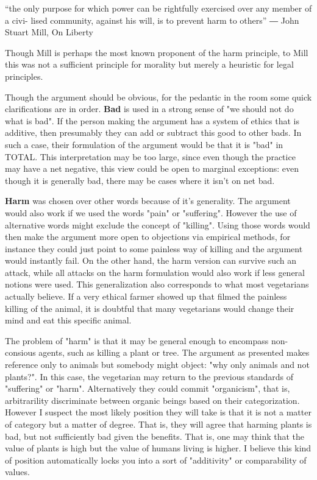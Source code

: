 \documentclass[12pt]{report}
\numberwithin{equation}{section}
\begin{document}
\begin{tcolorbox}[enhanced,%
  colback=green!25!black!10!white,colframe=green!75!black,title=Principle of utility (10cm),
  drop fuzzy shadow,watermark color=white,watermark text=Fit]
“the only purpose for which power can be rightfully exercised over any member of a civi- lised community, against his will, is to prevent harm to others”
― John Stuart Mill, On Liberty
\end{tcolorbox}


Though Mill is perhaps the most known proponent of the harm principle, to Mill this was not a sufficient principle for morality but merely a heuristic for legal principles. 

Though the argument should be obvious, for the pedantic in the room some quick clarifications are in order. \textbf{Bad} is used in a strong sense of "we should not do what is bad". If the person making the argument has a system of ethics that is additive, then presumably they can add or subtract this good to other bads. In such a case, their formulation of the argument would be that it is "bad" in TOTAL. This interpretation may be too large, since even though the practice may have a net negative, this view could be open to marginal exceptions: even though it is generally bad, there may be cases where it isn't on net bad. 

\textbf{Harm} was chosen over other words because of it's generality. The argument would also work if we used the words "pain" or "suffering". However the use of alternative words might exclude the concept of "killing". Using those words would then make the argument more open to objections via empirical methods, for instance they could just point to some painless way of killing and the argument would instantly fail. On the other hand, the harm version can survive such an attack, while all attacks on the harm formulation would also work if less general notions were used. This generalization also corresponds to what most vegetarians actually believe. If a very ethical farmer showed up that filmed the painless killing of the animal, it is doubtful that many vegetarians would change their mind and eat this specific animal. 

The problem of "harm" is that it may be general enough to encompass non-consious agents, such as killing a plant or tree. The argument as presented makes reference only to animals but somebody might object: "why only animals and not plants?". In this case, the vegetarian may return to the previous standards of "suffering" or "harm". Alternatively they could commit "organicism", that is, arbitrarility discriminate between organic beings based on their categorization. However I suspect the most likely position they will take is that it is not a matter of category but a matter of degree. That is, they will agree that harming plants is bad, but not sufficiently bad given the benefits. That is, one may think that the value of plants is high but the value of humans living is higher. I believe this kind of position automatically locks you into a sort of  "additivity" or comparability of values. 
\end{document}
